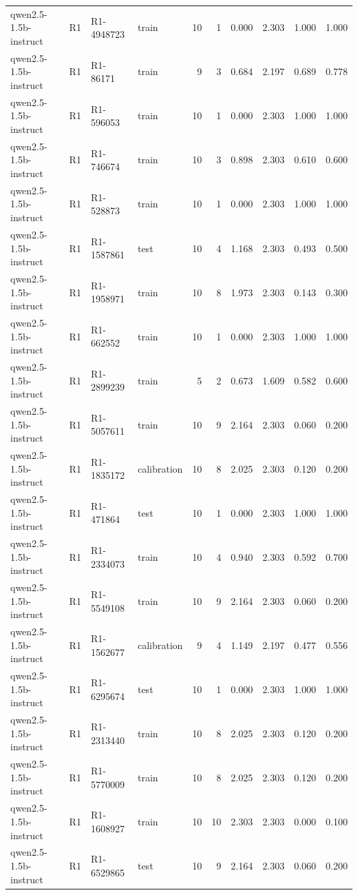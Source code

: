 \begin{table}
\begin{tabular}{llllrrrrrr}
qwen2.5-1.5b-instruct & R1 & R1-4948723 & train & 10 & 1 & 0.000 & 2.303 & 1.000 & 1.000 \\
qwen2.5-1.5b-instruct & R1 & R1-86171 & train & 9 & 3 & 0.684 & 2.197 & 0.689 & 0.778 \\
qwen2.5-1.5b-instruct & R1 & R1-596053 & train & 10 & 1 & 0.000 & 2.303 & 1.000 & 1.000 \\
qwen2.5-1.5b-instruct & R1 & R1-746674 & train & 10 & 3 & 0.898 & 2.303 & 0.610 & 0.600 \\
qwen2.5-1.5b-instruct & R1 & R1-528873 & train & 10 & 1 & 0.000 & 2.303 & 1.000 & 1.000 \\
qwen2.5-1.5b-instruct & R1 & R1-1587861 & test & 10 & 4 & 1.168 & 2.303 & 0.493 & 0.500 \\
qwen2.5-1.5b-instruct & R1 & R1-1958971 & train & 10 & 8 & 1.973 & 2.303 & 0.143 & 0.300 \\
qwen2.5-1.5b-instruct & R1 & R1-662552 & train & 10 & 1 & 0.000 & 2.303 & 1.000 & 1.000 \\
qwen2.5-1.5b-instruct & R1 & R1-2899239 & train & 5 & 2 & 0.673 & 1.609 & 0.582 & 0.600 \\
qwen2.5-1.5b-instruct & R1 & R1-5057611 & train & 10 & 9 & 2.164 & 2.303 & 0.060 & 0.200 \\
qwen2.5-1.5b-instruct & R1 & R1-1835172 & calibration & 10 & 8 & 2.025 & 2.303 & 0.120 & 0.200 \\
qwen2.5-1.5b-instruct & R1 & R1-471864 & test & 10 & 1 & 0.000 & 2.303 & 1.000 & 1.000 \\
qwen2.5-1.5b-instruct & R1 & R1-2334073 & train & 10 & 4 & 0.940 & 2.303 & 0.592 & 0.700 \\
qwen2.5-1.5b-instruct & R1 & R1-5549108 & train & 10 & 9 & 2.164 & 2.303 & 0.060 & 0.200 \\
qwen2.5-1.5b-instruct & R1 & R1-1562677 & calibration & 9 & 4 & 1.149 & 2.197 & 0.477 & 0.556 \\
qwen2.5-1.5b-instruct & R1 & R1-6295674 & test & 10 & 1 & 0.000 & 2.303 & 1.000 & 1.000 \\
qwen2.5-1.5b-instruct & R1 & R1-2313440 & train & 10 & 8 & 2.025 & 2.303 & 0.120 & 0.200 \\
qwen2.5-1.5b-instruct & R1 & R1-5770009 & train & 10 & 8 & 2.025 & 2.303 & 0.120 & 0.200 \\
qwen2.5-1.5b-instruct & R1 & R1-1608927 & train & 10 & 10 & 2.303 & 2.303 & 0.000 & 0.100 \\
qwen2.5-1.5b-instruct & R1 & R1-6529865 & test & 10 & 9 & 2.164 & 2.303 & 0.060 & 0.200 \\

\end{tabular}
\end{table}
